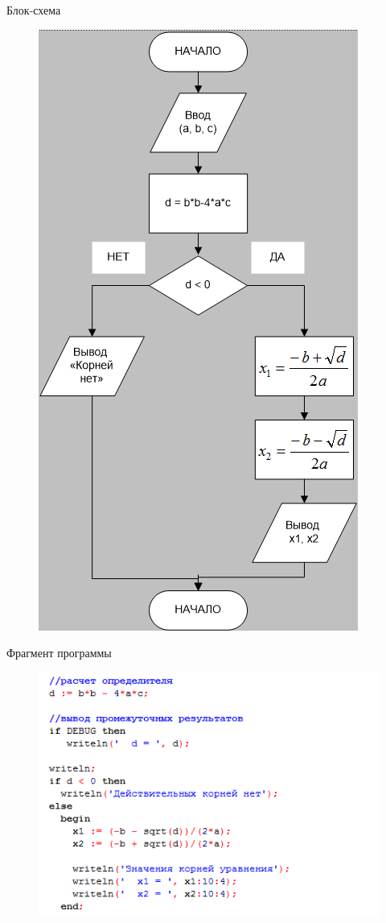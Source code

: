 \documentclass{beamer}
\begin{document}
\begin{frame}[fragile]{Блок-схема}
\begin{figure}[h]
\centering
\includegraphics[scale=0.35]{images/lec03-pic10.png}
\end{figure}
\end{frame}

\begin{frame}[fragile]{Фрагмент программы}
\begin{figure}[h]
\centering
\includegraphics[scale=0.75]{images/lec03-pic11.png}
\end{figure}
\end{frame}
\end{document}
